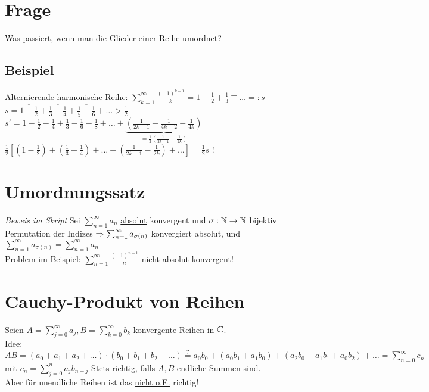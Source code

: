 \section*{Frage}
Was passiert, wenn man die Glieder einer Reihe umordnet?

\subsection*{Beispiel}
Alternierende harmonische Reihe: $\sum_{k=1}^\infty \frac{(-1)^{k-1}}{k} = 1 - \frac{1}{2} + \frac{1}{3} \mp \ldots =: s$\\
$s = \overline{1-\frac{1}{2}}+\overline{\frac{1}{3}-\frac{1}{4}}+\overline{\frac{1}{5}-\frac{1}{6}}+\ldots > \frac{1}{2}$\\
$s' = \overline{1-\frac{1}{2}-\frac{1}{4}}+\overline{\frac{1}{3}-\frac{1}{6}-\frac{1}{8}} + \ldots + \underbrace{\left(\frac{1}{2k-1}-\frac{1}{4k-2}-\frac{1}{4k}\right)}_{=\frac{1}{2}\left(\frac{1}{2k-1}-\frac{1}{2k}\right)}$\\
$\frac{1}{2}\left[\left(1-\frac{1}{2}\right) + \left(\frac{1}{3}-\frac{1}{4}\right) + \ldots + \left(\frac{1}{2k-1}-\frac{1}{2k}\right) + \ldots \right] = \frac{1}{2} s$ !

\newpage

\section{Umordnungssatz}\label{7.15}
\emph{Beweis im Skript}\nl
Sei $\sum_{n=1}^\infty a_n$ \underline{absolut} konvergent und $\sigma: \mathbb{N} \to \mathbb{N}$ bijektiv\\
Permutation der Indizes $\Rightarrow \sum_{n=1}^\infty a_{\sigma(n)}$ konvergiert absolut, und $\sum_{n=1}^\infty a_{\sigma(n)} = \sum_{n=1}^\infty a_n$\\
Problem im Beispiel: $\sum_{n=1}^\infty \frac{(-1)^{n-1}}{n}$ \underline{nicht} absolut konvergent!

\section*{Cauchy-Produkt von Reihen}
Seien $A = \sum_{j=0}^\infty a_j, B = \sum_{k=0}^\infty b_k$ konvergente Reihen in $\mathbb{C}$.\\
Idee: $AB = (a_0+a_1+a_2+\ldots)\cdot(b_0+b_1+b_2+\ldots) \overset{\text{?}}{=} a_0 b_0 + (a_0 b_1 + a_1 b_0) + (a_2 b_0 + a_1 b_1 + a_0 b_2) + \ldots = \sum_{n=0}^\infty c_n$ mit $c_n = \sum_{j=0}^n a_j b_{n-j}$\nl
Stets richtig, falls $A, B$ endliche Summen sind.\\
Aber für unendliche Reihen ist das \underline{nicht o.E.} richtig!

